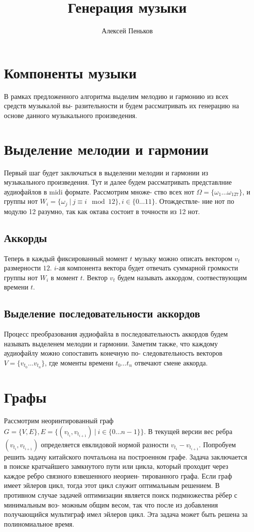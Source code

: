 \documentclass[a4paper,11pt]{article}
\author{Алексей Пеньков}
\title{Генерация музыки}
\date{}
\begin{document}
	\noindent
	\maketitle{}
	
	\section* {Компоненты музыки}
	В рамках предложенного алгоритма выделим мелодию и гармонию из всех средств музыкалой вы- разительности и будем рассматривать их генерацию на основе данного музыкального произведения.
	\section* {Выделение мелодии и гармонии}
	Первый шаг будет заключаться в выделении мелодии и гармонии из музыкального произведения. Тут и далее будем рассматривать представлние аудиофайлов в midi формате. Рассмотрим множе- ство всех нот $\Omega = \{\omega_{1} \ldots \omega_{127}\}$, и группы нот $W_{i} = \{\omega_{j} \ | \ j \equiv i \mod 12\}, i \in \{0 \ldots 11\}$. Отождествле- ние нот по модулю 12 разумно, так как октава состоит в точности из 12 нот.
	\subsection*{Аккорды}
	Теперь в каждый фиксированный момент $t$ музыку можно описать вектором $v_t$ размерности $12$. $i$-ая компонента вектора будет отвечать суммарной громкости группы нот $W_{i}$ в момент $t$. Вектор $v_t$ будем называть аккордом, соотвествующим времени $t$.
	\subsection*{Выделение последовательности аккордов}
	Процесс преобразования аудиофайла в последовательность аккордов будем называть выделенем мелодии и гармонии. Заметим также, что каждому аудиофайлу можно сопоставить конечную по- следовательность векторов $V = \{v_{t_0} \ldots v_{t_n}\}$, где моменты времени $t_0 \ldots t_n$ отвечают смене аккорда.
	\section*{Графы}
	Рассмотрим неоринтированный граф $ G = \{V, E\}, E = \Big\{(v_{t_i}, v_{t_{i+1}}) \ | \ i \in \{0 \ldots n - 1\}\Big\}$. В текущей
	версии вес ребра $(v_{t_i}, v_{t_{i+1}})$ определяется евклидовой нормой разности $v_{t_i} - v_{t_{i+1}}$. Попробуем решить задачу китайского почтальона на построенном графе. Задача заключается в поиске кратчайшего замкнутого пути или цикла, который проходит через каждое ребро связного взвешенного неориен- тированного графа. Если граф имеет эйлеров цикл, тогда этот цикл служит оптимальным решением. В противном случае задачей оптимизации является поиск подмножества рёбер с минимальным воз- можным общим весом, так что после из добавления получающийся мультиграф имел эйлеров цикл. Эта задача может быть решена за полиномиальное время.
\end{document}
